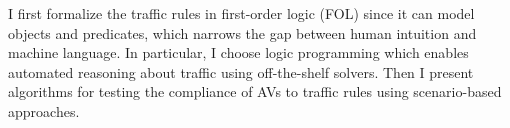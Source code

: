 I first formalize the traffic rules in first-order logic (FOL) since it can model objects and predicates, which narrows the gap between human intuition and machine language.
%
In particular, I choose logic programming which enables automated reasoning about traffic using off-the-shelf solvers.
%
Then I present algorithms for testing the compliance of AVs to traffic rules using scenario-based approaches.


\clearpage
